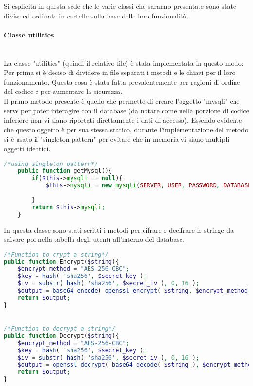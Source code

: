 Si esplicita in questa sede che le varie classi che saranno presentate sono state divise ed ordinate in cartelle sulla base delle loro funzionalità.\\

\paragraph{Classe utilities}\leavevmode\\
La classe "utilities" (quindi il relativo file) è stata implementata in questo modo:\\
Per prima si è deciso di dividere in file separati i metodi e le chiavi per il loro funzionamento. Questa cosa è stata fatta prevalentemente per ragioni di ordine del codice e per aumentare la sicurezza.\\
Il primo metodo presente è quello che permette di creare l'oggetto "mysqli" che serve per poter interagire con il database (da notare come nella porzione di codice inferiore non vi siano riportati direttamente i dati di accesso). Essendo evidente che questo oggetto è per sua stessa statico, durante l'implementazione del metodo si è usato il "singleton pattern" per evitare che in memoria vi siano multipli oggetti identici.\\

\begin{lstlisting}[language=php]
	/*using singleton pattern*/
	public function getMysql(){
		if($this->mysqli == null){
			$this->mysqli = new mysqli(SERVER, USER, PASSWORD, DATABASE);
			
		}
		return $this->mysqli;
	}
\end{lstlisting}

In questa classe sono stati scritti i metodi per cifrare e decifrare le stringe da salvare poi nella tabella degli utenti all'interno del database.\\

\begin{lstlisting}[language=php]
/*Function to crypt a string*/
public function Encrypt($string){
	$encrypt_method = "AES-256-CBC";
	$key = hash( 'sha256', $secret_key );
	$iv = substr( hash( 'sha256', $secret_iv ), 0, 16 );
	$output = base64_encode( openssl_encrypt( $string, $encrypt_method, $key, 0, $iv ) );
	return $output;
}


/*Function to decrypt a string*/
public function Decrypt($string){
	$encrypt_method = "AES-256-CBC";
	$key = hash( 'sha256', $secret_key );
	$iv = substr( hash( 'sha256', $secret_iv ), 0, 16 );
	$output = openssl_decrypt( base64_decode( $string ), $encrypt_method, $key, 0, $iv );
	return $output;
}
\end{lstlisting}

